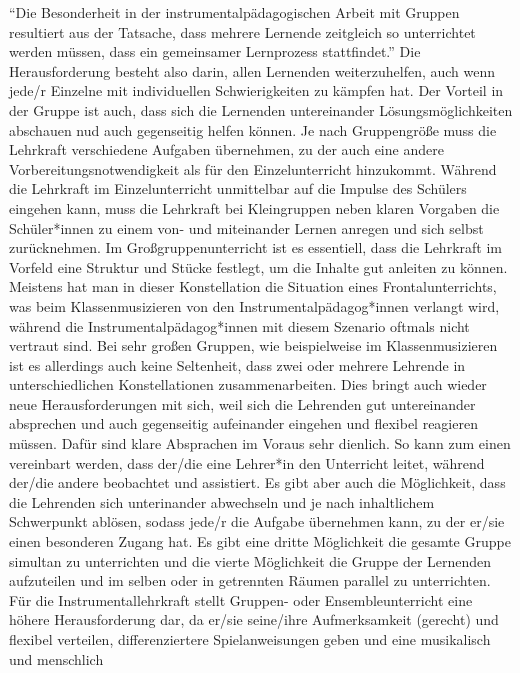 \enquote{Die Besonderheit in der instrumentalpädagogischen Arbeit mit Gruppen
resultiert aus der Tatsache, dass mehrere Lernende zeitgleich so unterrichtet
werden müssen, dass ein gemeinsamer Lernprozess stattfindet.}
\autocite[221]{busch:grundwissen_instrumentalpaedagogik} Die Herausforderung
besteht also darin, allen Lernenden weiterzuhelfen, auch wenn jede/r Einzelne
mit individuellen Schwierigkeiten zu kämpfen hat. Der Vorteil in der Gruppe ist
auch, dass sich die Lernenden untereinander Lösungsmöglichkeiten abschauen nud
auch gegenseitig helfen können. Je nach Gruppengröße muss die Lehrkraft
verschiedene Aufgaben übernehmen, zu der auch eine andere
Vorbereitungsnotwendigkeit als für den Einzelunterricht hinzukommt. Während die
Lehrkraft im Einzelunterricht unmittelbar auf die Impulse des Schülers eingehen
kann, muss die Lehrkraft bei Kleingruppen neben klaren Vorgaben die
Schüler*innen zu einem von- und miteinander Lernen anregen und sich selbst
zurücknehmen. Im Großgruppenunterricht ist es essentiell, dass die Lehrkraft im
Vorfeld eine Struktur und Stücke festlegt, um die Inhalte gut anleiten zu
können.\autocite[220]{busch:grundwissen_instrumentalpaedagogik} Meistens hat man
in dieser Konstellation die Situation eines Frontalunterrichts, was beim
Klassenmusizieren von den Instrumentalpädagog*innen verlangt wird, während die
Instrumentalpädagog*innen mit diesem Szenario oftmals nicht vertraut sind. Bei
sehr großen Gruppen, wie beispielweise im Klassenmusizieren ist es allerdings
auch keine Seltenheit, dass zwei oder mehrere Lehrende in unterschiedlichen
Konstellationen zusammenarbeiten. Dies bringt auch wieder neue Herausforderungen
mit sich, weil sich die Lehrenden gut untereinander absprechen und auch
gegenseitig aufeinander eingehen und flexibel reagieren müssen. Dafür sind klare
Absprachen im Voraus sehr dienlich. So kann zum einen vereinbart werden, dass
der/die eine Lehrer*in den Unterricht leitet, während der/die andere beobachtet
und assistiert. Es gibt aber auch die Möglichkeit, dass die Lehrenden sich
unterinander abwechseln und je nach inhaltlichem Schwerpunkt ablösen, sodass
jede/r die Aufgabe übernehmen kann, zu der er/sie einen besonderen Zugang hat.
Es gibt eine dritte Möglichkeit die gesamte Gruppe simultan zu unterrichten und
die vierte Möglichkeit die Gruppe der Lernenden aufzuteilen und im selben oder
in getrennten Räumen parallel zu unterrichten. Für die Instrumentallehrkraft
stellt Gruppen- oder Ensembleunterricht eine höhere Herausforderung dar, da
er/sie seine/ihre Aufmerksamkeit (gerecht) und flexibel verteilen,
differenziertere Spielanweisungen geben und eine musikalisch und menschlich
